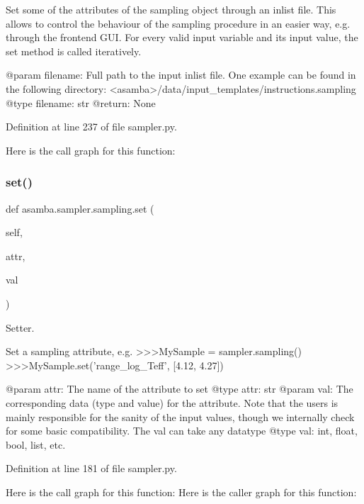\begin{DoxyVerb}Set some of the attributes of the sampling object through an inlist file. This allows to control
the behaviour of the sampling procedure in an easier way, e.g. through the frontend GUI. For every
valid input variable and its input value, the set method is called iteratively.

@param filename: Full path to the input inlist file. One example can be found in the following 
   directory: <asamba>/data/input_templates/instructions.sampling
@type filename: str
@return: None
\end{DoxyVerb}
 

Definition at line 237 of file sampler.\+py.

Here is the call graph for this function\+:
\mbox{\label{classasamba_1_1sampler_1_1sampling_a682af8a360751e2fb6dd215fe571ea43}} 
\subsubsection{\texorpdfstring{set()}{set()}}
{\footnotesize\ttfamily def asamba.\+sampler.\+sampling.\+set (\begin{DoxyParamCaption}\item[{}]{self,  }\item[{}]{attr,  }\item[{}]{val }\end{DoxyParamCaption})}



Setter. 

\begin{DoxyVerb}Set a sampling attribute, e.g.
>>>MySample = sampler.sampling()
>>>MySample.set('range_log_Teff', [4.12, 4.27])

@param attr: The name of the attribute to set
@type attr: str
@param val: The corresponding data (type and value) for the attribute. 
   Note that the users is mainly responsible for the sanity of the input values, 
   though we internally check for some basic compatibility. The val can take any
   datatype
@type val: int, float, bool, list, etc.
\end{DoxyVerb}
 

Definition at line 181 of file sampler.\+py.

Here is the call graph for this function\+:
Here is the caller graph for this function\+:
\mbox{\label{classasamba_1_1sampler_1_1sampling_ae0e3548d71adf58b309904e65b0e6e8c}} 
